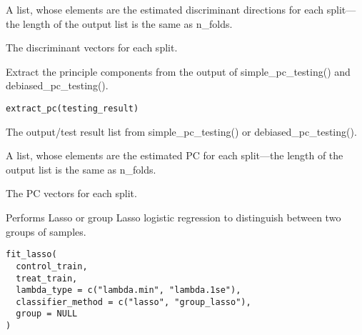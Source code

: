 \documentclass[a4paper]{book}
\begin{document}
%
\begin{Value}
A list, whose elements are the estimated discriminant directions for each split---the length of the output list is the same as n\_folds.

The discriminant vectors for each split.
\end{Value}
%
\begin{Description}
Extract the principle components from the output of simple\_pc\_testing() and debiased\_pc\_testing().
\end{Description}
%
\begin{Usage}
\begin{verbatim}
extract_pc(testing_result)
\end{verbatim}
\end{Usage}
%
\begin{Arguments}
\begin{ldescription}
\item[\code{testing\_result}] The output/test result list from simple\_pc\_testing() or debiased\_pc\_testing().
\end{ldescription}
\end{Arguments}
%
\begin{Value}
A list, whose elements are the estimated PC for each split---the length of the output list is the same as n\_folds.

The PC vectors for each split.
\end{Value}
%
\begin{Description}
Performs Lasso or group Lasso logistic regression to distinguish between two groups of samples.
\end{Description}
%
\begin{Usage}
\begin{verbatim}
fit_lasso(
  control_train,
  treat_train,
  lambda_type = c("lambda.min", "lambda.1se"),
  classifier_method = c("lasso", "group_lasso"),
  group = NULL
)
\end{verbatim}
\end{Usage}
%
\end{document}
